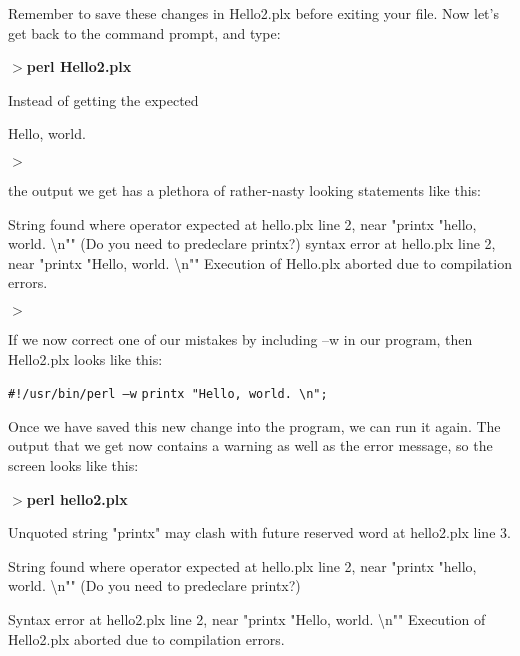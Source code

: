 \documentclass[a4paper,11pt]{book}
\begin{document}
\noindent

\noindent Remember to save these changes in Hello2.plx before exiting your file. Now let's get back to the command prompt, and type:

\noindent 

\noindent \textbf{$>$perl Hello2.plx}

\noindent 

\noindent Instead of getting the expected

\noindent Hello, world.

\noindent $>$

\noindent 

\noindent the output we get has a plethora of rather-nasty looking statements like this:

\noindent 

\noindent String found where operator expected at hello.plx line 2, near "printx "hello, world. \textbackslash n"" (Do you need to predeclare printx?) syntax error at hello.plx line 2, near "printx "Hello, world. \textbackslash n"" Execution of Hello.plx aborted due to compilation errors.

\noindent $>$

\noindent 

\noindent If we now correct one of our mistakes by including --w in our program, then Hello2.plx looks like this:

\noindent 

\noindent \texttt{\#!/usr/bin/perl --w}
\noindent \texttt{printx "Hello, world. \textbackslash n";}

\noindent 

\noindent Once we have saved this new change into the program, we can run it again. The output that we get now contains a warning as well as the error message, so the screen looks like this:

\noindent 

\noindent \textbf{$>$perl hello2.plx}

\noindent 

\noindent Unquoted string "printx" may clash with future reserved word at hello2.plx line 3.

\noindent String found where operator expected at hello.plx line 2, near "printx "hello, world. \textbackslash n"" (Do you need to predeclare printx?)

\noindent Syntax error at hello2.plx line 2, near "printx "Hello, world. \textbackslash n"" Execution of Hello2.plx aborted due to compilation errors.
\end{document}
